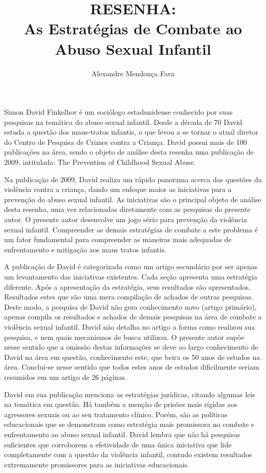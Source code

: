 \documentclass[12pt]{article}
\title{RESENHA: \\ As Estratégias de Combate ao Abuso Sexual Infantil}
\author{Alexandre Mendonça Fava\inst{1}}
\begin{document}
 

\maketitle


Simon David Finkelhor é um sociólogo estadunidense conhecido por suas pesquisas na temática do abuso sexual infantil. Desde a década de 70 David estuda a questão dos maus-tratos infantis, o que levou a se tornar o atual diretor do Centro de Pesquisa de Crimes contra a Criança. David possui mais de 100 publicações na área, sendo o objeto de análise desta resenha uma publicação de 2009, intitulada: The Prevention of Childhood Sexual Abuse.

Na publicação de 2009, David realiza um rápido panorama acerca das questões da violência contra a criança, dando um enfoque maior as iniciativas para a prevenção do abuso sexual infantil. As iniciativas são o principal objeto de análise desta resenha, uma vez relacionadas diretamente com as pesquisas do presente autor. O presente autor desenvolve um jogo sério para prevenção da violência sexual infantil. Compreender as demais estratégias de combate a este problema é um fator fundamental para compreender as maneiras mais adequadas de enfrentamento e mitigação aos maus tratos infantis. 

A publicação de David é categorizada como um artigo secundário por ser apenas um levantamento das iniciativas existentes. Cada seção apresenta uma estratégia diferente. Após a apresentação da estratégia, seus resultados são apresentados. Resultados estes que são uma mera compilação de achados de outras pesquisas. Deste modo, a pesquisa de David não gera conhecimento novo (artigo primário), apenas compila os resultados e achados de demais pesquisas na área de combate a violência sexual infantil. David não detalha no artigo a forma como realizou sua pesquisa, e nem quais mecanismos de busca utilizou. O presente autor supõe nesse sentido que a omissão destas informações se deve ao largo conhecimento de David na área em questão, conhecimento este, que beira os 50 anos de estudos na área. Conclui-se nesse sentido que todos estes anos de estudos dificilmente seriam resumidos em um artigo de 26 páginas. 

David em sua publicação menciona as estratégias jurídicas, citando algumas leis na temática em questão. Há também a menção de prisões mais rígidas aos agressores sexuais ou ao seu tratamento clínico. Porém, são as políticas educacionais que se demonstram como estratégia mais promissora no combate e enfrentamento ao abuso sexual infantil. David lembra que não há pesquisas suficientes que corroborem a efetividade de uma única iniciativa que lide completamente com a questão da violência infantil, contudo existem resultados extremamente promissores para as iniciativas educacionais. 
\end{document}
